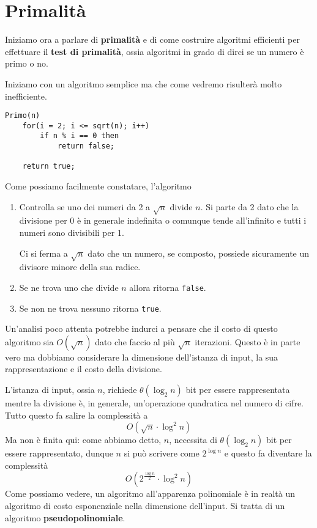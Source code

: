 \chapter{Primalit\`a}
Iniziamo ora a parlare di \textbf{primalit\`a} e di come costruire algoritmi efficienti per effettuare il
\textbf{test di primalit\`a}, ossia algoritmi in grado di dirci se un numero \`e primo o no.

Iniziamo con un algoritmo semplice ma che come vedremo risulter\`a molto inefficiente.
\begin{lstlisting}[style=pseudo-style]
Primo(n)
	for(i = 2; i <= sqrt(n); i++)
		if n % i == 0 then
			return false;
	
	return true;
\end{lstlisting}
Come possiamo facilmente constatare, l'algoritmo
\begin{enumerate}
	\item Controlla se uno dei numeri da 2 a $\sqrt{n}$ divide $n$. Si parte da 2 dato che la divisione per 0 \`e in
	      generale indefinita o comunque tende all'infinito e tutti i numeri sono divisibili per 1.

	      Ci si ferma a $\sqrt{n}$ dato che un numero, se composto, possiede sicuramente un divisore minore della sua
	      radice.
	\item Se ne trova uno che divide $n$ allora ritorna \verb|false|.
	\item Se non ne trova nessuno ritorna \verb|true|.
\end{enumerate}
Un'analisi poco attenta potrebbe indurci a pensare che il costo di questo algoritmo sia $O(\sqrt{n})$ dato che faccio al
pi\`u $\sqrt{n}$ iterazioni. Questo \`e in parte vero ma dobbiamo considerare la dimensione dell'istanza di input, la
sua rappresentazione e il costo della divisione.

L'istanza di input, ossia $n$, richiede $\theta(\log_2 n)$ bit per essere rappresentata mentre la divisione \`e, in
generale, un'operazione quadratica nel numero di cifre. Tutto questo fa salire la complessit\`a a
\[ O(\sqrt{n} \cdot \log^2 n) \]
Ma non \`e finita qui: come abbiamo detto, $n$, necessita di $\theta(\log_2 n)$ bit per essere rappresentato, dunque $n$
si pu\`o scrivere come $2^{\log n}$ e questo fa diventare la complessit\`a
\[ O(2^\frac{\log n}{2} \cdot \log^2 n) \]
Come possiamo vedere, un algoritmo all'apparenza polinomiale \`e in realt\`a un algoritmo di costo esponenziale nella
dimensione dell'input. Si tratta di un algoritmo \textbf{pseudopolinomiale}.